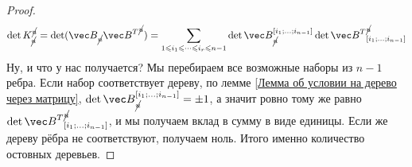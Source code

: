 \documentclass{article}
\begin{document}
    \begin{proof}
        \label{Доказательство теоремы Кирхгофа}
        $$
        \det K_{\cancel{u}}^{\cancel{u}}=\det({\vec B}_{\cancel u}{{\vec B}^T}^{\cancel u})=\sum\limits_{1\leqslant i_1\leqslant\cdots\leqslant i_r\leqslant n-1}\det{\vec B}_{\cancel u}^{[i_1;\ldots;i_{n-1}]}\det{{\vec B}^T}^{\cancel u}_{[i_1;\ldots;i_{n-1}]}
        $$
        Ну, и что у нас получается? Мы перебираем все возможные наборы из $n-1$ ребра. Если набор соответствует дереву, по лемме \ref{Лемма об условии на дерево через матрицу}, $\det{\vec B}_{\cancel u}^{[i_1;\ldots;i_{n-1}]}=\pm1$, а значит ровно тому же равно $\det{{\vec B}^T}^{\cancel u}_{[i_1;\ldots;i_{n-1}]}$, и мы получаем вклад в сумму в виде единицы. Если же дереву рёбра не соответствуют, получаем ноль. Итого именно количество остовных деревьев.
    \end{proof}
\end{document}

